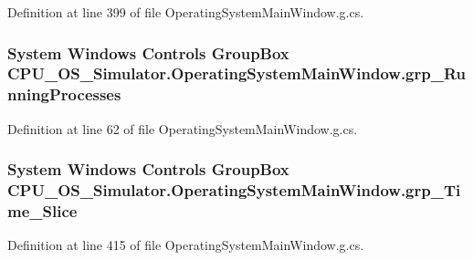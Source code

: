 Definition at line 399 of file Operating\+System\+Main\+Window.\+g.\+cs.

\hypertarget{class_c_p_u___o_s___simulator_1_1_operating_system_main_window_a07edb0a4de990e8120b24421e66f44ec}{}
\subsubsection[{grp\+\_\+\+Running\+Processes}]{\setlength{\rightskip}{0pt plus 5cm}System Windows Controls Group\+Box C\+P\+U\+\_\+\+O\+S\+\_\+\+Simulator.\+Operating\+System\+Main\+Window.\+grp\+\_\+\+Running\+Processes\hspace{0.3cm}{\ttfamily [package]}}\label{class_c_p_u___o_s___simulator_1_1_operating_system_main_window_a07edb0a4de990e8120b24421e66f44ec}


Definition at line 62 of file Operating\+System\+Main\+Window.\+g.\+cs.

\hypertarget{class_c_p_u___o_s___simulator_1_1_operating_system_main_window_a09854a80dc1796d59c66a12415e64c8c}{}
\subsubsection[{grp\+\_\+\+Time\+\_\+\+Slice}]{\setlength{\rightskip}{0pt plus 5cm}System Windows Controls Group\+Box C\+P\+U\+\_\+\+O\+S\+\_\+\+Simulator.\+Operating\+System\+Main\+Window.\+grp\+\_\+\+Time\+\_\+\+Slice\hspace{0.3cm}{\ttfamily [package]}}\label{class_c_p_u___o_s___simulator_1_1_operating_system_main_window_a09854a80dc1796d59c66a12415e64c8c}


Definition at line 415 of file Operating\+System\+Main\+Window.\+g.\+cs.

